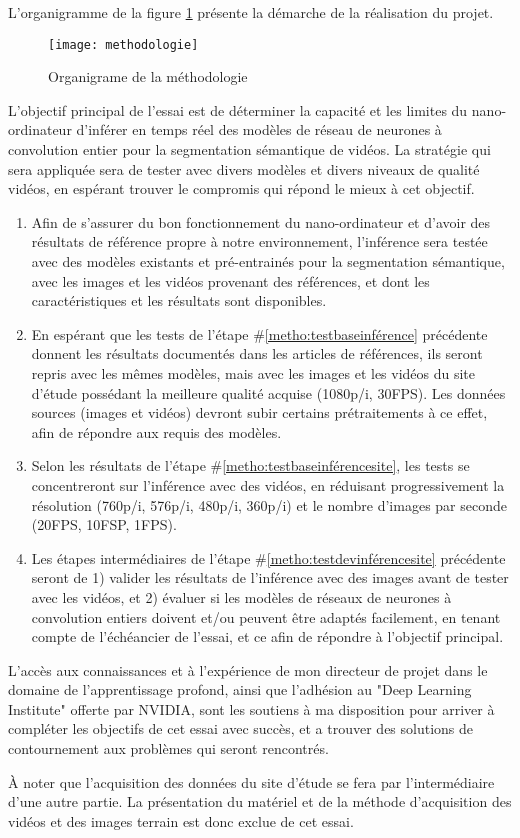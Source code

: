 \label{methodologie}
L'organigramme de la figure \ref{fig:methodologie1} présente la démarche de la réalisation du projet. 
\begin{figure}
    \centering
    \texttt{[image: methodologie]}
    \caption{Organigrame de la méthodologie}
    \label{fig:methodologie1}
\end{figure}
\par L'objectif principal de l'essai est de déterminer la capacité et les limites du nano-ordinateur d'inférer en temps réel des modèles de réseau de neurones à convolution entier pour la segmentation sémantique de vidéos. La stratégie qui sera appliquée sera de tester avec divers modèles et divers niveaux de qualité vidéos, en espérant trouver le compromis qui répond le mieux à cet objectif.
\begin{enumerate}
   \item \label{metho:testbaseinférence} Afin de s'assurer du bon fonctionnement du nano-ordinateur et d'avoir des résultats de référence propre à notre environnement, l'inférence sera testée avec des modèles existants et pré-entrainés pour la segmentation sémantique, avec les images et les vidéos provenant des références, et dont les caractéristiques et les résultats sont disponibles. 
   \item \label{metho:testbaseinférencesite} En espérant que les tests de l'étape \#\ref{metho:testbaseinférence} précédente donnent les résultats documentés dans les articles de références, ils seront repris avec les mêmes modèles, mais avec les images et les vidéos du site d'étude possédant la meilleure qualité acquise (1080p/i, 30FPS). Les données sources (images et vidéos) devront subir certains prétraitements à ce effet, afin de répondre aux requis des modèles.
   \item \label{metho:testdevinférencesite} Selon les résultats de l'étape \#\ref{metho:testbaseinférencesite}, les tests se concentreront sur l'inférence avec des vidéos, en réduisant progressivement la résolution (760p/i, 576p/i, 480p/i, 360p/i) et le nombre d'images par seconde (20FPS, 10FSP, 1FPS).
   \item Les étapes intermédiaires de l'étape \#\ref{metho:testdevinférencesite} précédente seront de 1) valider les résultats de l'inférence avec des images avant de tester avec les vidéos, et 2) évaluer si les modèles de réseaux de neurones à convolution entiers doivent et/ou peuvent être adaptés facilement, en tenant compte de l'échéancier de l'essai, et ce afin de répondre à l'objectif principal.
\end{enumerate}
\par L'accès aux connaissances et à l'expérience de mon directeur de projet dans le domaine de l'apprentissage profond, ainsi que l'adhésion au "Deep Learning Institute" offerte par NVIDIA, sont les soutiens à ma disposition  pour arriver à compléter les objectifs de cet essai avec succès, et a trouver des solutions de contournement aux problèmes qui seront rencontrés.
\par À noter que l'acquisition des données du site d'étude se fera par l'intermédiaire d'une autre partie. La présentation du matériel et de la méthode d'acquisition des vidéos et des images terrain est donc exclue de cet essai.

\vspace{1\baselineskip}
\par 